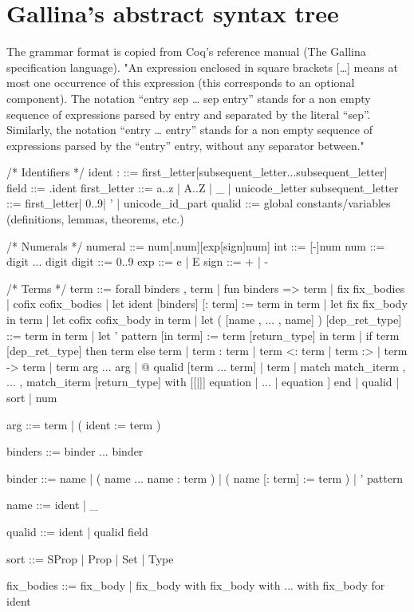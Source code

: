 \documentclass[a4paper,11pt]{article}
\begin{document}
\section{Gallina's abstract syntax tree}
The grammar format is copied from Coq's reference manual (The Gallina specification language). "An expression enclosed in square brackets […] means at most one occurrence of this expression (this corresponds to an optional component). The notation “entry sep … sep entry” stands for a non empty sequence of expressions parsed by entry and separated by the literal “sep”. Similarly, the notation “entry … entry” stands for a non empty sequence of expressions parsed by the “entry” entry, without any separator between."
\begin{grm}
/* Identifiers */
ident :			  ::= first_letter[subsequent_letter...subsequent_letter]
field             ::=  .ident
first_letter      ::=  a..z | A..Z | _ | unicode_letter 
subsequent_letter ::=  first_letter| 0..9| ' | unicode_id_part
qualid  ::=  global constants/variables (definitions, lemmas, theorems, etc.)

/* Numerals */
numeral ::=  num[.num][exp[sign]num]
int     ::=  [-]num
num     ::=  digit ... digit
digit   ::=  0..9
exp     ::=  e | E
sign    ::=  + | -

/* Terms */
term  ::=  forall binders , term
		 | fun binders => term
		 | fix fix_bodies
		 | cofix cofix_bodies
		 | let ident [binders] [: term] := term in term
		 | let fix fix_body in term
		 | let cofix cofix_body in term
		 | let ( [name , ... , name] ) [dep_ret_type] ::= term in term
		 | let ' pattern [in term] := term [return_type] in term
		 | if term [dep_ret_type] then term else term
		 | term : term
		 | term <: term
		 | term :>
		 | term -> term
		 | term arg ... arg   
		 | @ qualid [term ... term]
		 | term %
		 | match match_iterm , ... , match_iterm [return_type] with
		 	[[|]] equation | ... | equation ] end    
		 | qualid
		 | sort
		 | num

arg  ::=  term
		| ( ident := term )

binders ::=  binder ... binder

binder  ::=  name
		   | ( name ... name : term )
		   | ( name [: term] := term )
		   | ' pattern

name  ::=  ident | _

qualid ::=  ident | qualid field

sort  ::=  SProp | Prop | Set | Type

fix_bodies  ::=  fix_body
			   | fix_body with fix_body with ... with fix_body for ident


\end{grm}
\end{document}
